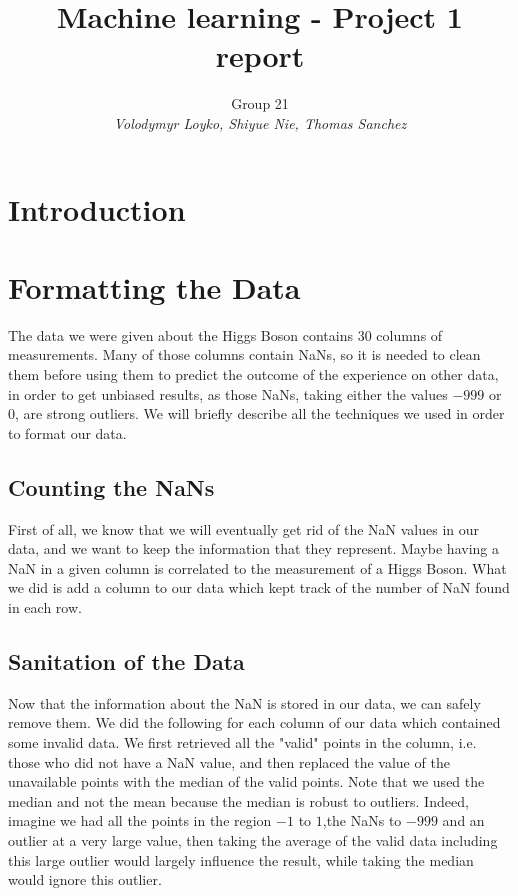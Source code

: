 \documentclass[10pt,conference,compsocconf]{IEEEtran}
\begin{document}
\title{Machine learning - Project 1 report}
\author{
Group 21\\
\textit{Volodymyr Loyko, Shiyue Nie, Thomas Sanchez}}

\maketitle

\section{Introduction}

\section{Formatting the Data}
The data we were given about the Higgs Boson contains 30 columns of measurements. Many of those columns contain NaNs, so it is needed to clean them before using them to predict the outcome of the experience on other data, in order to get unbiased results, as those NaNs, taking either the values $-999$ or $0$, are strong outliers. We will briefly describe all the techniques we used in order to format our data.
\subsection{Counting the NaNs}
First of all, we know that we will eventually get rid of the NaN values in our data, and we want to keep the information that they represent. Maybe having a NaN in a given column is correlated to the measurement of a Higgs Boson. What we did is add a column to our data which kept track of the number of NaN found in each row.

\subsection{Sanitation of the Data}
Now that the information about the NaN is stored in our data, we can safely remove them. We did the following for each column of our data which contained some invalid data. We first retrieved all the "valid" points in the column, i.e. those who did not have a NaN value, and then replaced the value of the unavailable points with the median of the valid points. 
Note that we used the median and not the mean because the median is robust to outliers. Indeed, imagine we had all the points in the region $-1$ to $1$,the NaNs to $-999$ and an outlier at a very large value, then taking the average of the valid data including this large outlier would largely influence the result, while taking the median would ignore this outlier. 
\end{document}
